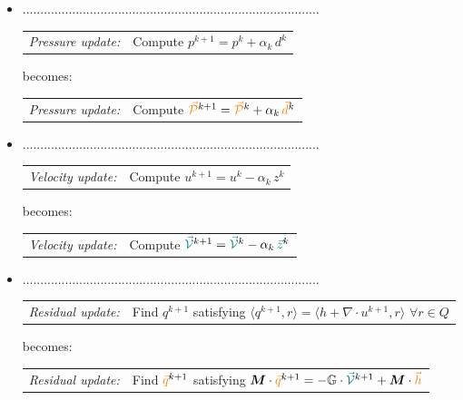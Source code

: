 \begin{itemize}
\item ....................................................................................
\begin{algobox}{}
\begin{tabular}{@{}r@{\quad}l@{}}
\textit{Pressure update:} & Compute $p^{k+1} = p^k + \alpha_k\, d^k$ 
\end{tabular} 
\end{algobox}
becomes:
\begin{algobox}{}
\begin{tabular}{@{}r@{\quad}l@{}}
\textit{Pressure update:} & Compute ${\color{orange}\vec{\cal P}}^{k+1} = {\color{orange}\vec{\cal P}}^k + \alpha_k\, {\color{orange}\vec{d}}^k$ 
\end{tabular} 
\end{algobox}


\item ....................................................................................
\begin{algobox}{}
\begin{tabular}{@{}r@{\quad}l@{}}
\textit{Velocity update:} & Compute $u^{k+1} = u^k - \alpha_k\, z^k$ 
\end{tabular} 
\end{algobox}
becomes:
\begin{algobox}{}
\begin{tabular}{@{}r@{\quad}l@{}}
\textit{Velocity update:} & Compute ${\color{teal}\vec{\cal V}}^{k+1} = {\color{teal}\vec{\cal V}}^k - \alpha_k\, {\color{teal}\vec{z}}^k$ 
\end{tabular} 
\end{algobox}


\item ....................................................................................
\begin{algobox}{}
\begin{tabular}{@{}r@{\quad}l@{}}
\textit{Residual update:} & Find $q^{k+1}$ satisfying $\langle q^{k+1}, r \rangle = \langle h + \nabla\!\cdot u^{k+1}, r \rangle$ \; $\forall r \in Q$ 
\end{tabular} 
\end{algobox}
becomes:
\begin{algobox}{}
\begin{tabular}{@{}r@{\quad}l@{}}
\textit{Residual update:} & Find ${\color{orange} \vec{q}}^{k+1}$ satisfying ${\bm M}\cdot {\color{orange}\vec{q}}^{k+1}=
 -{\mathbb{G}} \cdot {\color{teal}\vec{\cal V}}^{k+1} + {\bm M} \cdot {\color{orange}\vec{h}} $
\end{tabular} 
\end{algobox}



\end{itemize}
